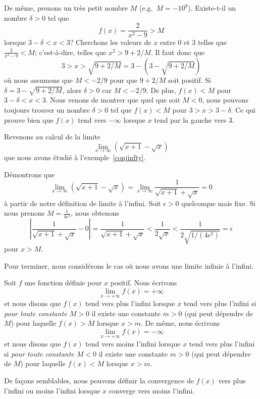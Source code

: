 {\begin{egg}
De même, prenons un très petit nombre $M$ (e.g.\ $M=-10^8$).
Existe-t-il un nombre $\delta>0$ tel que
\[
f(x)=\frac{2}{x^2-9} > M
\]
lorsque $3-\delta <x <3$?  Cherchons les valeurs de $x$ entre $0$ et
$3$ telles que $\displaystyle \frac{2}{x^2-9} < M$; c'est-à-dire,
telles que $x^2 > 9 + 2/M$.  Il faut donc que
\[
3> x > \sqrt{9+2/M} = 3 - (3 - \sqrt{9+2/M})
\]
où nous assumons que $M<-2/9$ pour que $9+2/M$ soit positif.
Si $\delta = 3 - \sqrt{9+2/M}$, alors $\delta > 0$ car $M < -2/9$.
De plus, $f(x)<M$ pour $3-\delta<x<3$.  Nous venons de montrer que
quel que soit $M<0$, nous pouvons toujours trouver un nombre
$\delta>0$ tel que $f(x)<M$ pour $3>x>3-\delta$.  Ce qui prouve bien
que $f(x)$ tend vers $-\infty$ lorsque $x$ tend par la gauche vers $3$. 
\end{egg}

\begin{egg}
Revenons au calcul de la limite
\[
\lim_{x\rightarrow \infty} \left(\sqrt{x+1}-\sqrt{x}\right)
\]
que nous avons étudié à l'exemple~\ref{conjinfty}.

Démontrons que
\[
\lim_{x\rightarrow \infty} \left(\sqrt{x+1}-\sqrt{x}\right)
= \lim_{x\rightarrow \infty} \frac{1}{\sqrt{x+1}+\sqrt{x}} = 0
\]
à partir de notre définition de limite à l'infini.  Soit
$\epsilon > 0$ quelconque mais fixe.  Si nous prenons 
$\displaystyle M = \frac{1}{4\epsilon^2}$, nous obtenons
\[
\left| \frac{1}{\sqrt{x+1}+\sqrt{x}} - 0 \right|
= \frac{1}{\sqrt{x+1}+\sqrt{x}} < \frac{1}{2\sqrt{x}}
< \frac{1}{2\sqrt{1/(4\epsilon^2)}} = \epsilon
\]
pour $x>M$.
\end{egg}

Pour terminer, nous considérons le cas où nous avons une limite infinie à
l'infini.

\begin{focus}{\dfn} 
Soit $f$ une fonction définie pour $x$ positif.  Nous écrivons
\[
\lim_{x\rightarrow +\infty} f(x) = +\infty
\]
et nous disons que $f(x)$ tend vers plus l'infini lorsque $x$ tend vers
plus l'infini si {\em pour toute constante $M>0$} il existe une constante
$m>0$ (qui peut dépendre de $M$) pour laquelle $f(x) > M$ lorsque $x>m$.  De
même, nous écrivons
\[
\lim_{x\rightarrow +\infty} f(x) = -\infty
\]
et nous disons que $f(x)$ tend vers moins l'infini lorsque $x$ tend vers
plus l'infini si {\em pour toute constante $M<0$} il existe une constante
$m>0$ (qui peut dépendre de $M$) pour laquelle $f(x) < M$ lorsque $x>m$.

De façons semblables, nous pouvons définir la convergence de $f(x)$ vers plus
l'infini ou moins l'infini lorsque $x$ converge vers moins l'infini.
\end{focus}

}

